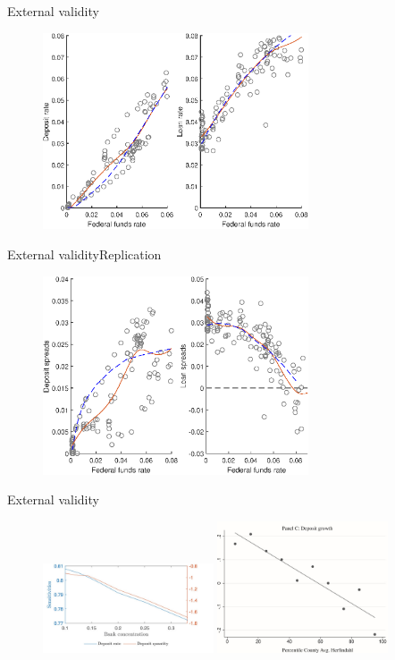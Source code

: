 \documentclass{beamer}
\begin{document}
\begin{frame}{External validity}
    \begin{figure}[htbp]
        \centering
        \includegraphics[width=0.7\textwidth]{replication_figure3.eps}
    \end{figure}
\end{frame}

\begin{frame}{External validity}{Replication}
    \begin{figure}[htbp]
        \centering
        \includegraphics[width=0.7\textwidth]{replication_figure1.eps}
    \end{figure}
\end{frame}

\begin{frame}{External validity}
    \begin{figure}[htbp]
        \centering
        \includegraphics[width=0.45\textwidth]{Figure4a.jpg}
        \includegraphics[width=0.45\textwidth]{DSS2017.jpg}
        \end{figure}
\end{frame}
\end{document}
